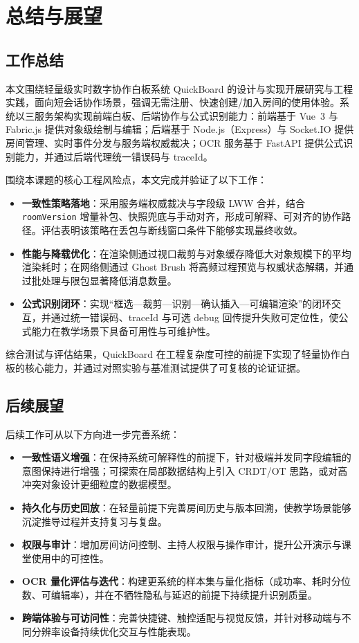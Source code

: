 \chapter{总结与展望}\label{chap:conclusion}

\section{工作总结}
本文围绕轻量级实时数字协作白板系统 QuickBoard 的设计与实现开展研究与工程实践，面向短会话协作场景，强调无需注册、快速创建/加入房间的使用体验。系统以三服务架构实现前端白板、后端协作与公式识别能力：前端基于 Vue~3 与 Fabric.js 提供对象级绘制与编辑；后端基于 Node.js（Express）与 Socket.IO 提供房间管理、实时事件分发与服务端权威裁决；OCR 服务基于 FastAPI 提供公式识别能力，并通过后端代理统一错误码与 traceId。

围绕本课题的核心工程风险点，本文完成并验证了以下工作：
\begin{itemize}
  \item \textbf{一致性策略落地}：采用服务端权威裁决与字段级 LWW 合并，结合 \texttt{roomVersion} 增量补包、快照兜底与手动对齐，形成可解释、可对齐的协作路径。评估表明该策略在丢包与断线窗口条件下能够实现最终收敛。
  \item \textbf{性能与降载优化}：在渲染侧通过视口裁剪与对象缓存降低大对象规模下的平均渲染耗时；在网络侧通过 Ghost Brush 将高频过程预览与权威状态解耦，并通过批处理与限包显著降低消息数量。
  \item \textbf{公式识别闭环}：实现“框选—裁剪—识别—确认插入—可编辑渲染”的闭环交互，并通过统一错误码、traceId 与可选 debug 回传提升失败可定位性，使公式能力在教学场景下具备可用性与可维护性。
\end{itemize}

综合测试与评估结果，QuickBoard 在工程复杂度可控的前提下实现了轻量协作白板的核心能力，并通过对照实验与基准测试提供了可复核的论证证据。

\section{后续展望}
后续工作可从以下方向进一步完善系统：
\begin{itemize}
  \item \textbf{一致性语义增强}：在保持系统可解释性的前提下，针对极端并发同字段编辑的意图保持进行增强；可探索在局部数据结构上引入 CRDT/OT 思路，或对高冲突对象设计更细粒度的数据模型。
  \item \textbf{持久化与历史回放}：在轻量前提下完善房间历史与版本回溯，使教学场景能够沉淀推导过程并支持复习与复盘。
  \item \textbf{权限与审计}：增加房间访问控制、主持人权限与操作审计，提升公开演示与课堂使用中的可控性。
  \item \textbf{OCR 量化评估与迭代}：构建更系统的样本集与量化指标（成功率、耗时分位数、可编辑率），并在不牺牲隐私与延迟的前提下持续提升识别质量。
  \item \textbf{跨端体验与可访问性}：完善快捷键、触控适配与视觉反馈，并针对移动端与不同分辨率设备持续优化交互与性能表现。
\end{itemize}
